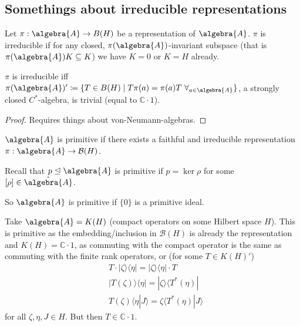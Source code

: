 \documentclass[a4paper]{article}
\begin{document}
\subsection{Somethings about irreducible representations}

Let $\pi: \algebra{A} \to B(H)$ be a representation of $\algebra{A}$.
$\pi$ is irreducible if for any closed, $\pi(\algebra{A})$-invariant subspace (that is $\pi(\algebra{A})K \subseteq K$) we have $K = 0$ or $K = H$ already.

\begin{lemma}[Schur]
	$\pi$ is irreducible iff $\pi(\algebra{A})' \coloneqq \{T \in B(H) \mid T \pi(a) = \pi(a) T \ \forall_{a \in \algebra{A}} \}$, a strongly closed $C^*$-algebra, is trivial (equal to $\mathds{C} \cdot 1$).
\end{lemma}

\begin{proof}
	Requires things about von-Neumann-algebras.
\end{proof}

\begin{exercise}[04-07]
	$\algebra{A}$ is primitive if there exists a faithful and irreducible representation $\pi: \algebra{A} \to \mathcal{B}(H)$.

	Recall that $p \trianglelefteq \algebra{A}$ is primitive if $p = \ker \rho$ for some $[\rho] \in \hat{\algebra{A}}$.

	So $\algebra{A}$ is primitive if $\{0\}$ is a primitive ideal.
\end{exercise}

\begin{example}
	Take $\algebra{A} = K(H)$ (compact operators on some Hilbert space $H$).
	This is primitive as the embedding/inclusion in $\mathcal{B}(H)$ is already the representation and $K(H) = \mathds{C} \cdot 1$, as commuting with the compact operator is the same as commuting with the finite rank operators, or (for some $T \in K(H)'$)
	\begin{align*}
		& T \cdot |\zeta\rangle \langle \eta| = |\zeta \rangle \langle \eta | \cdot T \\
		& |T(\zeta) \rangle \langle \eta| = |\zeta\rangle \langle T^*(\eta)| \\
		& T(\zeta)\langle \eta | J \rangle = \zeta \langle T^*(\eta) | J \rangle
	\end{align*}
	for all $\zeta, \eta, J \in H$. But then $T \in \mathds{C} \cdot 1$.
\end{example}
\end{document}
